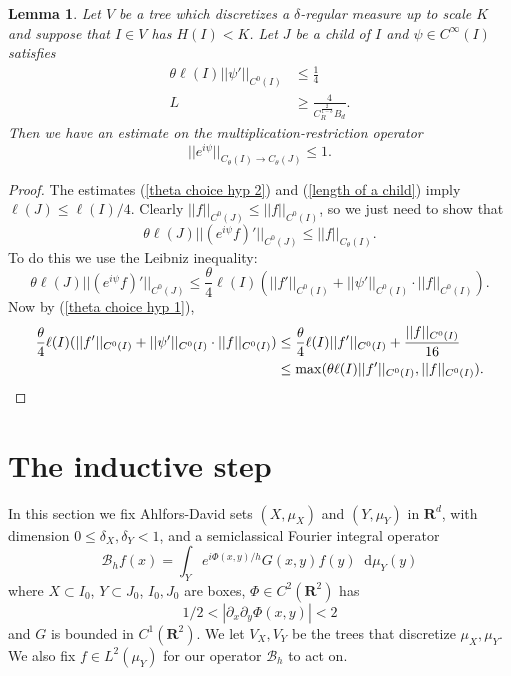 \documentclass[reqno,10pt]{amsart}
\newcommand{\RR}{\mathbf{R}}
\newcommand*\dif{\mathop{}\!\mathrm{d}}
\newtheorem{lemma}[theorem]{Lemma}
\theoremstyle{definition}
\numberwithin{equation}{section}
\begin{document}
\begin{lemma}
Let $V$ be a tree which discretizes a $\delta$-regular measure up to scale $K$ and suppose that $I \in V$ has $H(I) < K$.
Let $J$ be a child of $I$ and $\psi \in C^\infty(I)$ satisfies 
\begin{align}
\theta \ell(I) ||\psi'||_{C^0(I)} &\leq \frac{1}{4} \label{theta choice hyp 1}\\
L &\geq \frac{4}{C_R^{\frac{2}{1 - \delta}} B_d} \label{theta choice hyp 2}.
\end{align}
Then we have an estimate on the multiplication-restriction operator
\begin{equation}\label{theta choice concl}
||e^{i\psi}||_{C_\theta(I) \to C_\theta(J)} \leq 1.
\end{equation}
\end{lemma}
\begin{proof}
The estimates (\ref{theta choice hyp 2}) and (\ref{length of a child}) imply $\ell(J) \leq \ell(I)/4$.
Clearly $||f||_{C^0(J)} \leq ||f||_{C^0(I)}$, so we just need to show that 
$$\theta \ell(J) ||(e^{i\psi}f)'||_{C^0(J)} \leq ||f||_{C_\theta(I)}.$$
To do this we use the Leibniz inequality:
$$\theta \ell(J) ||(e^{i\psi}f)'||_{C^0(J)} \leq \frac{\theta}{4} \ell(I) (||f'||_{C^0(I)} + ||\psi'||_{C^0(I)} \cdot ||f||_{C^0(I)}).$$
Now by (\ref{theta choice hyp 1}),
\begin{align*}
\frac{\theta}{4} \ell(I) (||f'||_{C^0(I)} + ||\psi'||_{C^0(I)} \cdot ||f||_{C^0(I)})
&\leq \frac{\theta}{4} \ell(I) ||f'||_{C^0(I)} + \frac{||f||_{C^0(I)}}{16}  \\
&\leq \max(\theta \ell(I) ||f'||_{C^0(I)}, ||f||_{C^0(I)}). \qedhere
\end{align*}
\end{proof}


\section{The inductive step}
In this section we fix Ahlfors-David sets $(X, \mu_X)$ and $(Y, \mu_Y)$ in $\RR^d$, with dimension $0 \leq \delta_X, \delta_Y < 1$, and a semiclassical Fourier integral operator 
$$\mathcal B_h f(x) = \int_Y e^{i\Phi(x, y)/h} G(x, y) f(y) \dif \mu_Y(y)$$
where $X \subset I_0$, $Y \subset J_0$, $I_0, J_0$ are boxes, $\Phi \in C^2(\RR^2)$ has
$$1/2 < |\partial_x \partial_y \Phi(x, y)| < 2$$
and $G$ is bounded in $C^1(\RR^2)$.
We let $V_X, V_Y$ be the trees that discretize $\mu_X, \mu_Y$.
We also fix $f \in L^2(\mu_Y)$ for our operator $\mathcal B_h$ to act on.
\end{document}
